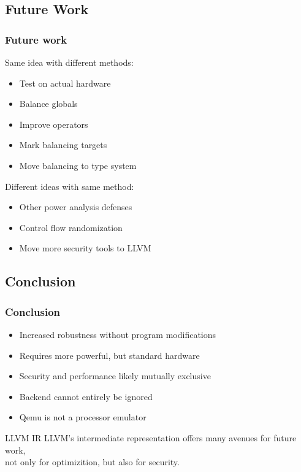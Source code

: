 \documentclass[11pt,t,usepdftitle=false,aspectratio=169]{beamer}
\begin{document}

\subsection{Future Work}
\begin{frame}
  \frametitle{Future work}
  Same idea with different methods:
  \begin{itemize}
  \item Test on actual hardware
  \item Balance globals
  \item Improve operators
  \item Mark balancing targets
  \item Move balancing to type system
  \end{itemize}
  \vspace{0.5cm}
  Different ideas with same method:
  \begin{itemize}
  \item Other power analysis defenses
  \item Control flow randomization
  \item Move more security tools to LLVM
  \end{itemize}
\end{frame}

\subsection{Conclusion}
\begin{frame}
  \frametitle{Conclusion}
  \begin{itemize}
  \item Increased robustness without program modifications
  \item Requires more powerful, but standard hardware
  \item Security and performance likely mutually exclusive
  \item Backend cannot entirely be ignored
  \item Qemu is not a processor emulator
  \end{itemize}
  \vfill
  \begin{block}{LLVM IR}
    LLVM's intermediate representation offers many avenues for future work,\\
    not only for optimizition, but also for security.
  \end{block}
\end{frame}
\end{document}
